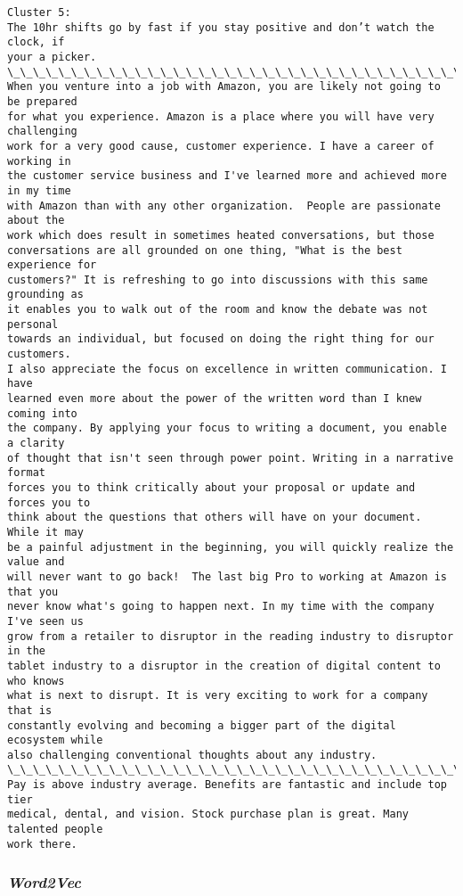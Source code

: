 \documentclass[11pt]{article}
\begin{document}
\begin{Verbatim}[commandchars=\\\{\}]
Cluster 5:
The 10hr shifts go by fast if you stay positive and don’t watch the clock, if
your a picker.
\_\_\_\_\_\_\_\_\_\_\_\_\_\_\_\_\_\_\_\_\_\_\_\_\_\_\_\_\_\_\_\_\_\_\_\_\_\_\_\_\_\_\_\_\_\_\_\_\_\_\_\_\_\_\_\_\_\_\_\_\_\_\_\_\_\_\_\_\_\_
When you venture into a job with Amazon, you are likely not going to be prepared
for what you experience. Amazon is a place where you will have very challenging
work for a very good cause, customer experience. I have a career of working in
the customer service business and I've learned more and achieved more in my time
with Amazon than with any other organization.  People are passionate about the
work which does result in sometimes heated conversations, but those
conversations are all grounded on one thing, "What is the best experience for
customers?" It is refreshing to go into discussions with this same grounding as
it enables you to walk out of the room and know the debate was not personal
towards an individual, but focused on doing the right thing for our customers.
I also appreciate the focus on excellence in written communication. I have
learned even more about the power of the written word than I knew coming into
the company. By applying your focus to writing a document, you enable a clarity
of thought that isn't seen through power point. Writing in a narrative format
forces you to think critically about your proposal or update and forces you to
think about the questions that others will have on your document. While it may
be a painful adjustment in the beginning, you will quickly realize the value and
will never want to go back!  The last big Pro to working at Amazon is that you
never know what's going to happen next. In my time with the company I've seen us
grow from a retailer to disruptor in the reading industry to disruptor in the
tablet industry to a disruptor in the creation of digital content to who knows
what is next to disrupt. It is very exciting to work for a company that is
constantly evolving and becoming a bigger part of the digital ecosystem while
also challenging conventional thoughts about any industry.
\_\_\_\_\_\_\_\_\_\_\_\_\_\_\_\_\_\_\_\_\_\_\_\_\_\_\_\_\_\_\_\_\_\_\_\_\_\_\_\_\_\_\_\_\_\_\_\_\_\_\_\_\_\_\_\_\_\_\_\_\_\_\_\_\_\_\_\_\_\_
Pay is above industry average. Benefits are fantastic and include top tier
medical, dental, and vision. Stock purchase plan is great. Many talented people
work there.
    \end{Verbatim}

    \hypertarget{word2vec}{%
\subsubsection{\texorpdfstring{\emph{Word2Vec}}{Word2Vec}}\label{word2vec}}
\end{document}
